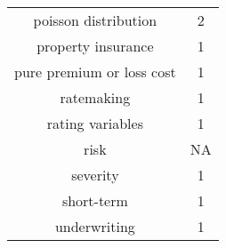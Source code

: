 \documentclass[]{book}
\theoremstyle{definition}
\theoremstyle{definition}
\theoremstyle{definition}
\theoremstyle{remark}
\begin{document}
\begin{longtable}[]{@{}cc@{}}
\begin{minipage}[t]{0.43\columnwidth}
poisson distribution\strut
\end{minipage} & \begin{minipage}[t]{0.30\columnwidth}\centering\strut
2\strut
\end{minipage}\tabularnewline
\begin{minipage}[t]{0.43\columnwidth}\centering\strut
property insurance\strut
\end{minipage} & \begin{minipage}[t]{0.30\columnwidth}\centering\strut
1\strut
\end{minipage}\tabularnewline
\begin{minipage}[t]{0.43\columnwidth}\centering\strut
pure premium or loss cost\strut
\end{minipage} & \begin{minipage}[t]{0.30\columnwidth}\centering\strut
1\strut
\end{minipage}\tabularnewline
\begin{minipage}[t]{0.43\columnwidth}\centering\strut
ratemaking\strut
\end{minipage} & \begin{minipage}[t]{0.30\columnwidth}\centering\strut
1\strut
\end{minipage}\tabularnewline
\begin{minipage}[t]{0.43\columnwidth}\centering\strut
rating variables\strut
\end{minipage} & \begin{minipage}[t]{0.30\columnwidth}\centering\strut
1\strut
\end{minipage}\tabularnewline
\begin{minipage}[t]{0.43\columnwidth}\centering\strut
risk\strut
\end{minipage} & \begin{minipage}[t]{0.30\columnwidth}\centering\strut
NA\strut
\end{minipage}\tabularnewline
\begin{minipage}[t]{0.43\columnwidth}\centering\strut
severity\strut
\end{minipage} & \begin{minipage}[t]{0.30\columnwidth}\centering\strut
1\strut
\end{minipage}\tabularnewline
\begin{minipage}[t]{0.43\columnwidth}\centering\strut
short-term\strut
\end{minipage} & \begin{minipage}[t]{0.30\columnwidth}\centering\strut
1\strut
\end{minipage}\tabularnewline
\begin{minipage}[t]{0.43\columnwidth}\centering\strut
underwriting\strut
\end{minipage} & \begin{minipage}[t]{0.30\columnwidth}\centering\strut
1\strut
\end{minipage}\tabularnewline
\bottomrule
\end{longtable}


\end{document}
